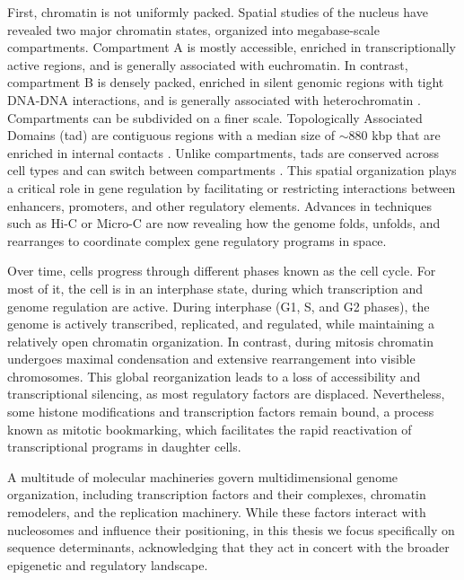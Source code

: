 \documentclass[11pt]{book}
\begin{document}
First, chromatin is not uniformly packed. Spatial studies of the nucleus have revealed two major chromatin states, organized into megabase-scale compartments. Compartment A is mostly accessible, enriched in transcriptionally active regions, and is generally associated with euchromatin. In contrast, compartment B is densely packed, enriched in silent genomic regions with tight DNA-DNA interactions, and is generally associated with heterochromatin \cite{lieberman-aiden_comprehensive_2009,bonev_organization_2016}. Compartments can be subdivided on a finer scale. Topologically Associated Domains (\gls{tad}) are contiguous regions with a median size of $\sim$880 kbp that are enriched in internal contacts \cite{rao_3d_2014}. Unlike compartments, \glspl{tad} are conserved across cell types and can switch between compartments \cite{dixon_chromatin_2016}. This spatial organization plays a critical role in gene regulation by facilitating or restricting interactions between enhancers, promoters, and other regulatory elements. Advances in techniques such as Hi-C or Micro-C are now revealing how the genome folds, unfolds, and rearranges to coordinate complex gene regulatory programs in space.

Over time, cells progress through different phases known as the cell cycle. For most of it, the cell is in an interphase state, during which transcription and genome regulation are active. During interphase (G1, S, and G2 phases), the genome is actively transcribed, replicated, and regulated, while maintaining a relatively open chromatin organization\cite{probst_epigenetic_2009}. In contrast, during mitosis chromatin undergoes maximal condensation and extensive rearrangement into visible chromosomes. This global reorganization leads to a loss of accessibility and transcriptional silencing, as most regulatory factors are displaced. Nevertheless, some histone modifications and transcription factors remain bound, a process known as mitotic bookmarking, which facilitates the rapid reactivation of transcriptional programs in daughter cells\cite{festuccia_transcription_2019}.

A multitude of molecular machineries govern multidimensional genome organization, including transcription factors and their complexes, chromatin remodelers, and the replication machinery. While these factors interact with nucleosomes and influence their positioning, in this thesis we focus specifically on sequence determinants, acknowledging that they act in concert with the broader epigenetic and regulatory landscape.
\end{document}
